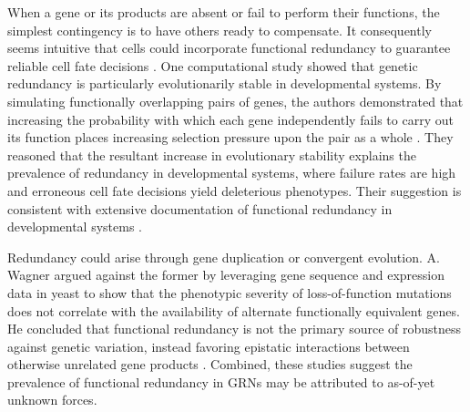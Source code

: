 When a gene or its products are absent or fail to perform their functions, the simplest contingency is to have others ready to compensate. It consequently seems intuitive that cells could incorporate functional redundancy to guarantee reliable cell fate decisions \cite{Hartman2001,McAdams1999}. One computational study showed that genetic redundancy is particularly evolutionarily stable in developmental systems. By simulating functionally overlapping pairs of genes, the authors demonstrated that increasing the probability with which each gene independently fails to carry out its function places increasing selection pressure upon the pair as a whole \cite{Nowak1997}. They reasoned that the resultant increase in evolutionary stability explains the prevalence of redundancy in developmental systems, where failure rates are high and erroneous cell fate decisions yield deleterious phenotypes. Their suggestion is consistent with extensive documentation of functional redundancy in developmental systems \cite{Kitano2004}. 

Redundancy could arise through gene duplication or convergent evolution. A. Wagner argued against the former by leveraging gene sequence and expression data in yeast to show that the phenotypic severity of loss-of-function mutations does not correlate with the availability of alternate functionally equivalent genes. He concluded that functional redundancy is not the primary source of robustness against genetic variation, instead favoring epistatic interactions between otherwise unrelated gene products \cite{Wagner2000}. Combined, these studies suggest the prevalence of functional redundancy in GRNs may be attributed to as-of-yet unknown forces.
